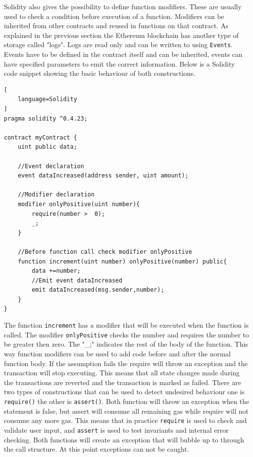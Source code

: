 \documentclass[a4paper]{article}
\begin{document}
Solidity also gives the possibility to define function modifiers. These are usually used to check a condition before execution of a function. Modifiers can be inherited from other contracts and reused in functions on that contract. As explained in the previous section the Ethereum blockchain has another type of storage called "logs".  Logs are read only and can be written to using \texttt{Events}. Events have to be defined in the contract itself and can be inherited, events can have specified parameters to emit the correct information. Below is a Solidity code snippet showing the basic behaviour of both constructions.
\begin{lstlisting}[
    language=Solidity
]
pragma solidity ^0.4.23;

contract myContract {
    uint public data; 
    
    //Event declaration
    event dataIncreased(address sender, uint amount);
    
    //Modifier declaration
    modifier onlyPositive(uint number){
        require(number >  0);
        _;
    }
    
    //Before function call check modifier onlyPositive
    function increment(uint number) onlyPositive(number) public{
        data +=number;
        //Emit event dataIncreased
        emit dataIncreased(msg.sender,number);
    }
} 
\end{lstlisting}
The function \texttt{increment} has a modifier that will be executed when the function is called. The modifier \texttt{onlyPositive} checks the number and requires the number to be greater then zero. The "\_;" indicates the rest of the body of the function. This way function modifiers can be used to add code before and after the normal function body. If the assumption fails the require will throw an exception and the transaction will stop executing. This means that all state changes made during the transactions are reverted and the transaction is marked as failed. There are two types of constructions that can be used to detect undesired behaviour one is \texttt{require()} the other is \texttt{assert()}. Both function will throw an exception when the statement is false, but assert will consume all remaining gas while require will not consume any more gas. This means that in practice \texttt{require} is used to check and validate user input, and \texttt{assert} is used to test invariants and internal error checking. Both functions will create an exception that will bubble up to through the call structure. At this point exceptions can not be caught.
\end{document}
